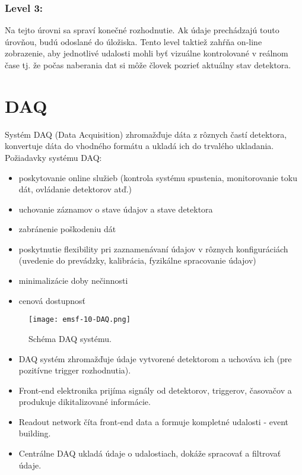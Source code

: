 \documentclass[../../main.tex]{subfiles}
\begin{document}
\subsubsection{Level 3:}
Na tejto úrovni sa spraví konečné rozhodnutie. Ak údaje prechádzajú touto úrovňou, budú odoslané do úložiska. Tento level taktiež zahŕňa on-line zobrazenie, aby jednotlivé udalosti mohli byť vizuálne kontrolované v reálnom čase tj. že počas naberania dat si môže človek pozrieť aktuálny stav detektora.

\section{DAQ}
Systém DAQ (Data Acquisition) zhromažďuje dáta z rôznych častí detektora, konvertuje dáta do vhodného formátu a ukladá ich do trvalého ukladania. Požiadavky systému DAQ:
\begin{itemize}
\item poskytovanie online služieb (kontrola systému spustenia, monitorovanie toku dát, ovládanie detektorov atď.)
\item uchovanie záznamov o stave údajov a stave detektora
\item zabránenie poškodeniu dát
\item poskytnutie flexibility pri zaznamenávaní údajov v rôznych konfiguráciách (uvedenie do prevádzky, kalibrácia, fyzikálne spracovanie údajov)
\item minimalizácie doby nečinnosti
\item cenová dostupnosť
\end{itemize}

\begin{figure}[!h]
\texttt{[image: emsf-10-DAQ.png]}
\centering
\caption{Schéma DAQ systému.}
\label{em10:fig:daq}
\end{figure}

\begin{itemize}
\item DAQ systém zhromažďuje údaje vytvorené detektorom a uchováva ich (pre pozitívne trigger rozhodnutia).
\item Front-end elektronika prijíma signály od detektorov, triggerov, časovačov a produkuje dikitalizované informácie.
\item Readout network číta front-end data a formuje kompletné udalosti - event building.
\item Centrálne DAQ ukladá údaje o udalostiach, dokáže spracovať a filtrovať údaje.
\end{itemize}
\end{document}
